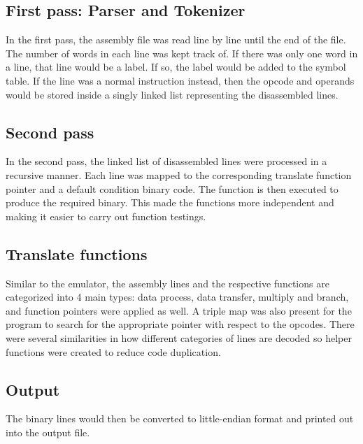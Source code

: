 \documentclass[11pt]{article}
\begin{document}
\subsection{First pass: Parser and Tokenizer}
    In the first pass, the assembly file was read line by line until the end of the file. The number of words in each line was kept track of. If there was only one word in a line, that line would be a label. If so, the label would be added to the symbol table. If the line was a normal instruction instead, then the opcode and operands would be stored inside a singly linked list representing the disassembled lines.
\subsection{Second pass}
    In the second pass, the linked list of disassembled lines were processed in a recursive manner. Each line was mapped to the corresponding translate function pointer and a default condition binary code. The function is then executed to produce the required binary. This made the functions more independent and making it easier to carry out function testings.
    
\subsection{Translate functions}
    Similar to the emulator, the assembly lines and the respective functions are categorized into 4 main types: data process, data transfer, multiply and branch, and function pointers were applied as well. A triple map was also present for the program to search for the appropriate pointer with respect to the opcodes. There were several similarities in how different categories of lines are decoded so helper functions were created to reduce code duplication.

\subsection{Output}
    The binary lines would then be converted to little-endian format and printed out into the output file.
    
\end{document}
